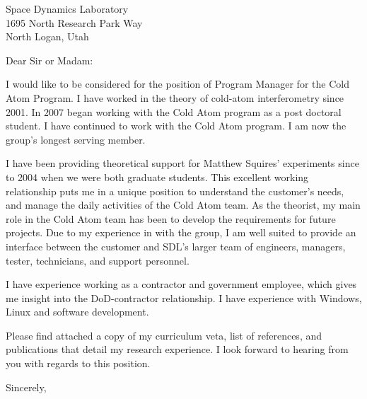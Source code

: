 \documentclass[12pt]{letter}
\begin{document}
\begin{letter}{Space Dynamics Laboratory \\ 1695 North Research Park Way \\ North Logan, Utah}

\opening{Dear Sir or Madam:}

I would like to be considered for the position of Program Manager for the Cold
Atom Program.  I have worked in the theory of cold-atom interferometry since
2001.   In 2007 began working with the Cold Atom program as a post doctoral
student.  I have continued to work with the Cold Atom program.  I am now the
group's longest serving member.  

I have been providing theoretical support for Matthew Squires' experiments since to 2004
when we were both graduate students.  This excellent working relationship puts
me in a unique position to understand the customer's needs, and manage the
daily activities of the Cold Atom team.   As the theorist, my main role in the
Cold Atom team has been to develop the requirements for future projects.  Due to my
experience in with the group, I am well suited to provide an interface between 
the customer and SDL's larger team of engineers, managers, tester, technicians,
and support personnel.  

I have experience working as a contractor and government employee, which gives me
insight into the DoD-contractor relationship.  I have experience with Windows,
Linux and software development.  

Please find attached a copy of my curriculum veta, list of references, and
publications that detail my research experience.  I look forward to hearing
from you with regards to this position. 

\closing{Sincerely, \\
    \\ 
}

\end{letter}
\end{document}
